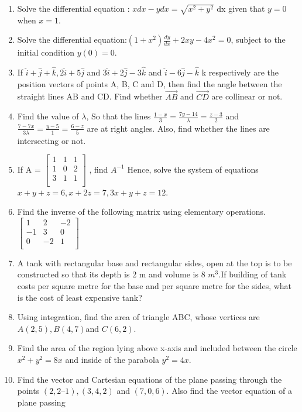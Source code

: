 \documentclass{article}
\begin{document}
\begin{enumerate}
\item Solve the differential equation : $x dx-y dx = \sqrt{x^2+y^2}$ dx given that $y=0$ when $x=1$.
\item Solve the differential equation:$(1+x^2)\frac{dy}{dx}+2xy-4x^2=0$, subject to the initial condition $y(0)=0$.
\item If  $\hat{i}+\hat{j}+\hat{k}, 2\hat{i}+5\hat{j}$ and $3\hat{i}+2\hat{j}-3\hat{k}$ and $\hat{i}-6\hat{j}-\hat{k}$ k respectively are the position vectors of points A, B, C and D, then find the angle between the straight lines AB and CD. Find whether $\vec{AB}$ and $\Vec{CD}$ are collinear or not. 
\item Find the value of $\lambda$, So that the lines $\frac{1-x}{3} = \frac{7y-14}{\lambda}=\frac{z-3}{2}$ and $\frac{7-7x}{3\lambda}=\frac{y-5}{1}=\frac{6-z}{5}$ are at right angles. Also, find whether the lines are intersecting or not. 
\item If A =
$\begin{bmatrix}
    1 & 1 & 1\\
    1 & 0 &  2\\
    3 & 1&  1\\
\end{bmatrix}$ , find $A^{-1}$  Hence, solve the system of equations $x + y + z = 6, x + 2z = 7, 3x + y + z = 12$.
\item Find the inverse of the following matrix using elementary operations.
$\begin{bmatrix}
    1 & 2 & -2\\
    -1 & 3 &  0\\
    0 & -2&  1\\
\end{bmatrix}$
\item A tank with rectangular base and rectangular sides, open at the top is to be constructed so that its depth is 2 m and volume is 8 $m^3$.If building of tank costs  per square metre for the base and  per square metre for the sides, what is the cost of least expensive tank? 
\item Using integration, find the area of triangle ABC, whose vertices are $A(2, 5), B(4, 7) $and $C(6, 2)$.
\item Find the area of the region lying above x-axis and included between the circle $x^2 + y^2 = 8x$  and inside of the parabola $y^2 = 4x$.
\item Find the vector and Cartesian equations of the plane passing through the points 
$(2, 2 –1), (3, 4, 2)$ and $(7, 0, 6)$. Also find the vector equation of a plane passing 

\end{enumerate}
\end{document}
